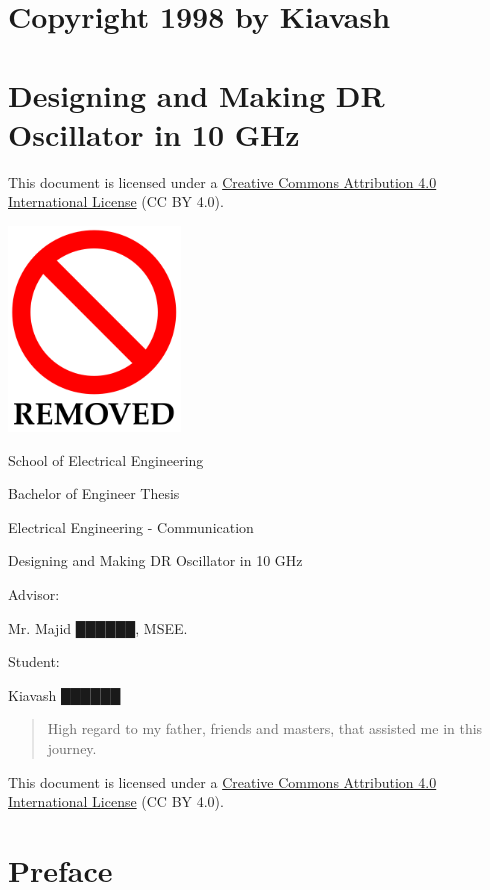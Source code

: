 \hypertarget{copyright-1998-by-kiavash}{%
\section{Copyright 1998 by Kiavash}\label{copyright-1998-by-kiavash}}

\hypertarget{designing-and-making-dr-oscillator-in-10-ghz}{%
\section{Designing and Making DR Oscillator in 10
GHz}\label{designing-and-making-dr-oscillator-in-10-ghz}}

This document is licensed under a
\href{http://creativecommons.org/licenses/by/4.0/}{Creative Commons
Attribution 4.0 International License} (CC BY 4.0).


\includegraphics[width=1.80549in,height=2.14792in]{media/image1.png}

School of Electrical Engineering

Bachelor of Engineer Thesis

Electrical Engineering - Communication

Designing and Making DR Oscillator in 10 GHz

Advisor:

Mr. Majid ██████, MSEE.

Student:

Kiavash ██████


\begin{quote}
High regard to my father, friends and masters, that assisted me in this
journey.
\end{quote}

This document is licensed under a
\href{http://creativecommons.org/licenses/by/4.0/}{Creative Commons
Attribution 4.0 International License} (CC BY 4.0).

\hypertarget{preface}{%
\section{Preface}\label{preface}}

